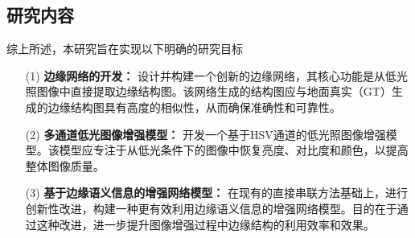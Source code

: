 \documentclass[a4paper]{ctexart}
\begin{document}
	
	\subsection{研究内容}
	
	综上所述，本研究旨在实现以下明确的研究目标
	
	
	\begin{itemize}
		\item [(1)] \textbf{边缘网络的开发：} 设计并构建一个创新的边缘网络，其核心功能是从低光照图像中直接提取边缘结构图。该网络生成的结构图应与地面真实（GT）生成的边缘结构图具有高度的相似性，从而确保准确性和可靠性。
		
		\item [(2)] \textbf{多通道低光图像增强模型：} 开发一个基于HSV通道的低光照图像增强模型。该模型应专注于从低光条件下的图像中恢复亮度、对比度和颜色，以提高整体图像质量。
		
		\item [(3)] \textbf{基于边缘语义信息的增强网络模型：} 在现有的直接串联方法基础上，进行创新性改进，构建一种更有效利用边缘语义信息的增强网络模型。目的在于通过这种改进，进一步提升图像增强过程中边缘结构的利用效率和效果。
	\end{itemize}
	
\end{document}
